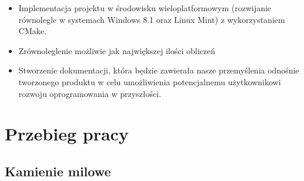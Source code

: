 \documentclass[polish, 12pt]{aghthesis}
\begin{document}
		\begin{itemize}
		
			\item Implementacja projektu w środowisku wieloplatformowym (rozwijanie równolegle w systemach Windows 8.1 oraz Linux Mint) z wykorzystaniem CMake.
			\item Zrównoleglenie możliwie jak największej ilości obliczeń
			\item Stworzenie dokumentacji, która będzie zawierała nasze przemyślenia odnośnie tworzonego produktu w celu umożliwienia potencjalnemu użytkownikowi rozwoju oprogramowania w przyszłości.
		
		\end{itemize}

\section{Przebieg pracy}
	
	\subsection{Kamienie milowe}
	
\end{document}
